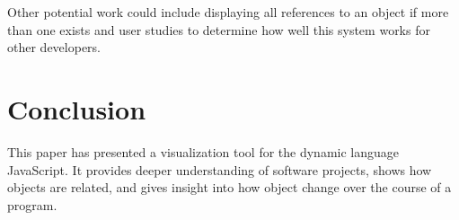 \documentclass[]{article}
\begin{document}
Other potential work could include displaying all references to an object if more than one exists and user studies to determine how well this system works for other developers.

\section{Conclusion}
\label{sec:conclusion}
This paper has presented a visualization tool for the dynamic language JavaScript. It provides  deeper understanding of software projects, shows how objects are related, and gives insight into how object change over the course of a program.



\end{document}
